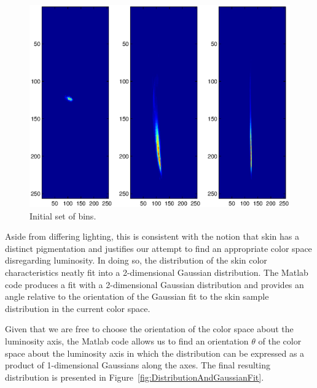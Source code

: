 \begin{figure}[h!]
  \centering
    \includegraphics[width=\textwidth]{Chapter3/Figs/InitialBins.eps}
    \caption{Initial set of bins.}  \label{fig:InitBins}
\end{figure}


Aside from differing lighting, this is consistent with the notion that skin has a distinct pigmentation and justifies our attempt to find an appropriate color space disregarding luminosity. In doing so, the distribution of the skin color characteristics neatly fit into a 2-dimensional Gaussian distribution. The Matlab code produces a fit with a 2-dimensional Gaussian distribution and provides an angle relative to the orientation of the Gaussian fit to the skin sample distribution in the current color space.

Given that we are free to choose the orientation of the color space about the luminosity axis, the Matlab code allows us to find an orientation $\theta$ of the color space about the luminosity axis in which the distribution can be expressed as a product of 1-dimensional Gaussians along the axes. The final resulting distribution is presented in Figure~\ref{fig:DistributionAndGaussianFit}.


